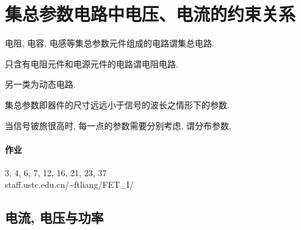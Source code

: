 \documentclass{ctexart}
\begin{document}
\section{集总参数电路中电压、电流的约束关系} %
\label{sec:集总参数电路中电压_电流的约束关系}

\begin{definition}
    电阻, 电容, 电感等集总参数元件组成的电路谓集总电路.
\end{definition}
\begin{definition}
    只含有电阻元件和电源元件的电路谓电阻电路.
\end{definition}
\begin{remark}
    另一类为动态电路.
\end{remark}
\begin{definition}
    集总参数即器件的尺寸远远小于信号的波长之情形下的参数.
\end{definition}
\begin{remark}
    当信号铍旅很高时, 每一点的参数需要分别考虑, 谓分布参数.
\end{remark}
\paragraph{作业} %
\label{par:作业}

3, 4, 6, 7, 12, 16, 21, 23, 37\\
staff.ustc.edu.cn/\textasciitilde ftliang/FET\_I/


\subsection{电流, 电压与功率} %
\label{sub:电流_电压与功率}
\end{document}
